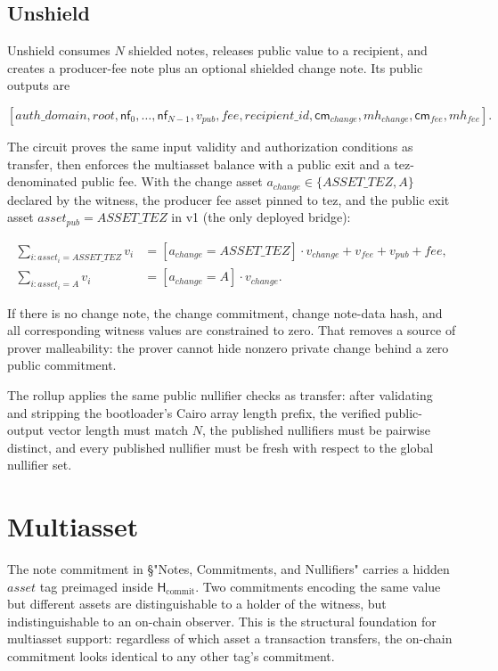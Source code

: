 \documentclass[11pt]{article}
\newcommand{\Hash}{\mathsf{H}}
\newcommand{\cm}{\mathsf{cm}}
\newcommand{\nf}{\mathsf{nf}}
\begin{document}
\subsection{Unshield}

Unshield consumes \(N\) shielded notes, releases public value to a recipient,
and creates a producer-fee note plus an optional shielded change note. Its
public outputs are

\[
[auth\_domain, root, \nf_0, \ldots, \nf_{N-1}, v_{pub}, fee,
 recipient\_id, \cm_{change}, mh_{change}, \cm_{fee}, mh_{fee}].
\]

The circuit proves the same input validity and authorization conditions as
transfer, then enforces the multiasset balance with a public exit and a
tez-denominated public fee. With the change asset \(a_{change} \in
\{ASSET\_TEZ, A\}\) declared by the witness, the producer fee asset pinned
to tez, and the public exit asset \(asset_{pub} = ASSET\_TEZ\) in v1 (the
only deployed bridge):

\begin{align*}
\sum_{i : asset_i = ASSET\_TEZ} v_i &= [a_{change} = ASSET\_TEZ] \cdot v_{change} + v_{fee} + v_{pub} + fee, \\
\sum_{i : asset_i = A} v_i &= [a_{change} = A] \cdot v_{change}.
\end{align*}

If there is no change note, the change commitment, change note-data hash, and all
corresponding witness values are constrained to zero. That removes a source of
prover malleability: the prover cannot hide nonzero private change behind a
zero public commitment.

The rollup applies the same public nullifier checks as transfer: after validating
and stripping the bootloader's Cairo array length prefix, the verified
public-output vector length must match \(N\), the published nullifiers must be
pairwise distinct, and every published nullifier must be fresh with respect to
the global nullifier set.

\section{Multiasset}

The note commitment in §"Notes, Commitments, and Nullifiers" carries a
hidden \(asset\) tag preimaged inside \(\Hash_{\mathrm{commit}}\). Two
commitments encoding the same value but different assets are
distinguishable to a holder of the witness, but indistinguishable to an
on-chain observer. This is the structural foundation for multiasset
support: regardless of which asset a transaction transfers, the
on-chain commitment looks identical to any other tag's commitment.
\end{document}
